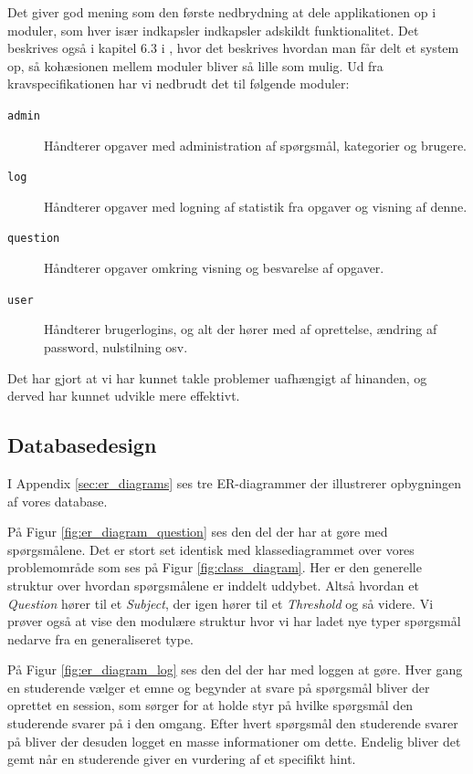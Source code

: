\documentclass[11pt, a4paper]{article}
\begin{document}
Det giver god mening som den første nedbrydning at dele applikationen op i moduler, som hver især indkapsler indkapsler adskildt funktionalitet. Det beskrives også i kapitel 6.3 i \cite{OOSE}, hvor det beskrives hvordan man får delt et system op, så kohæsionen mellem moduler bliver så lille som mulig. Ud fra kravspecifikationen har vi nedbrudt det til følgende moduler:
\begin{description}
    \item[\texttt{admin}] Håndterer opgaver med administration af spørgsmål, kategorier og brugere.
    \item[\texttt{log}] Håndterer opgaver med logning af statistik fra opgaver og visning af denne.
    \item[\texttt{question}] Håndterer opgaver omkring visning og besvarelse af opgaver.
    \item[\texttt{user}] Håndterer brugerlogins, og alt der hører med af oprettelse, ændring af password, nulstilning osv.
\end{description}

Det har gjort at vi har kunnet takle problemer uafhængigt af hinanden, og derved har kunnet udvikle mere effektivt.

\subsection{Databasedesign}
\label{sub:databasedesign}
I Appendix \ref{sec:er_diagrams} ses tre ER-diagrammer der illustrerer opbygningen af vores database.

På Figur \ref{fig:er_diagram_question} ses den del der har at gøre med spørgsmålene. Det er stort set identisk med klassediagrammet over vores problemområde som ses på Figur \ref{fig:class_diagram}. Her er den generelle struktur over hvordan spørgsmålene er inddelt uddybet. Altså hvordan et \emph{Question} hører til et \emph{Subject}, der igen hører til et \emph{Threshold} og så videre. Vi prøver også at vise den modulære struktur hvor vi har ladet nye typer spørgsmål nedarve fra en generaliseret type.

På Figur \ref{fig:er_diagram_log} ses den del der har med loggen at gøre. Hver gang en studerende vælger et emne og begynder at svare på spørgsmål bliver der oprettet en session, som sørger for at holde styr på hvilke spørgsmål den studerende svarer på i den omgang. Efter hvert spørgsmål den studerende svarer på bliver der desuden logget en masse informationer om dette. Endelig bliver det gemt når en studerende giver en vurdering af et specifikt hint.
\end{document}

